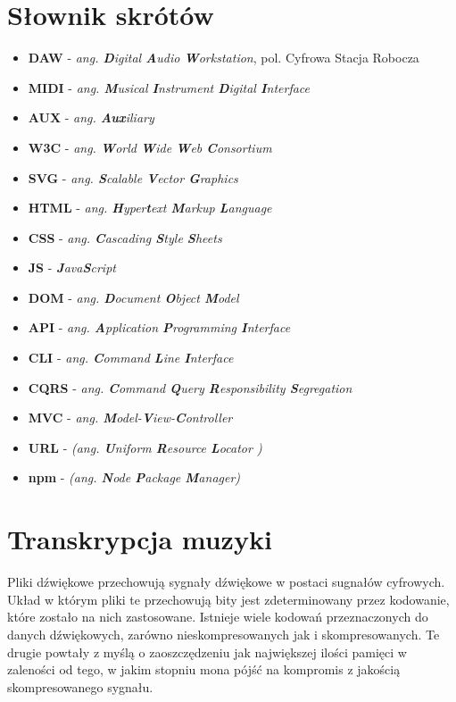 \documentclass[12pt,a4paper,twoside]{mwart}
\begin{document}
\section{Słownik skrótów}
\begin{itemize}
\item \textbf{DAW} - \textit{ang. \textbf{D}igital \textbf{A}udio \textbf{W}orkstation}, pol. Cyfrowa Stacja Robocza 
\item \textbf{MIDI} - \textit{ang. \textbf{M}usical \textbf{I}nstrument \textbf{D}igital \textbf{I}nterface}
\item \textbf{AUX} - \textit{ang. \textbf{Aux}iliary}
\item \textbf{W3C} - \textit{ang. \textbf{W}orld \textbf{W}ide \textbf{W}eb \textbf{C}onsortium}
\item \textbf{SVG} - \textit{ang. \textbf{S}calable \textbf{V}ector \textbf{G}raphics}
\item \textbf{HTML} - \textit{ang. \textbf{H}yper\textbf{t}ext \textbf{M}arkup \textbf{L}anguage}
\item \textbf{CSS} - \textit{ang.  \textbf{C}ascading \textbf{S}tyle \textbf{S}heets}
\item \textbf{JS} - \textit{\textbf{J}ava\textbf{S}cript}
\item \textbf{DOM} - \textit{ang. \textbf{D}ocument \textbf{O}bject \textbf{M}odel}
\item \textbf{API} - \textit{ang. \textbf{A}pplication \textbf{P}rogramming \textbf{I}nterface}
\item \textbf{CLI} - \textit{ang. \textbf{C}ommand \textbf{L}ine \textbf{I}nterface}
\item \textbf{CQRS} - \textit{ang. \textbf{C}ommand \textbf{Q}uery \textbf{R}esponsibility \textbf{S}egregation}
\item \textbf{MVC} - \textit{ang. \textbf{M}odel-\textbf{V}iew-\textbf{C}ontroller}
\item \textbf{URL} - \textit{(ang. \textbf{U}niform \textbf{R}esource \textbf{L}ocator )}
\item \textbf{npm} - \textit{(ang. \textbf{N}ode \textbf{P}ackage \textbf{M}anager)}
  
\end{itemize}
\newpage
\setcounter{secnumdepth}{2}

\section{Transkrypcja muzyki}
Pliki dźwiękowe przechowują sygnały dźwiękowe w postaci sugnałów cyfrowych. Układ w którym pliki te przechowują bity jest zdeterminowany przez kodowanie, które zostało na nich zastosowane. Istnieje wiele kodowań przeznaczonych do danych dźwiękowych, zarówno nieskompresowanych jak i skompresowanych. Te drugie powtały z myślą o zaoszczędzeniu jak największej ilości pamięci w zaleności od tego, w jakim stopniu mona pójść na kompromis z jakością skompresowanego sygnału.
\end{document}
